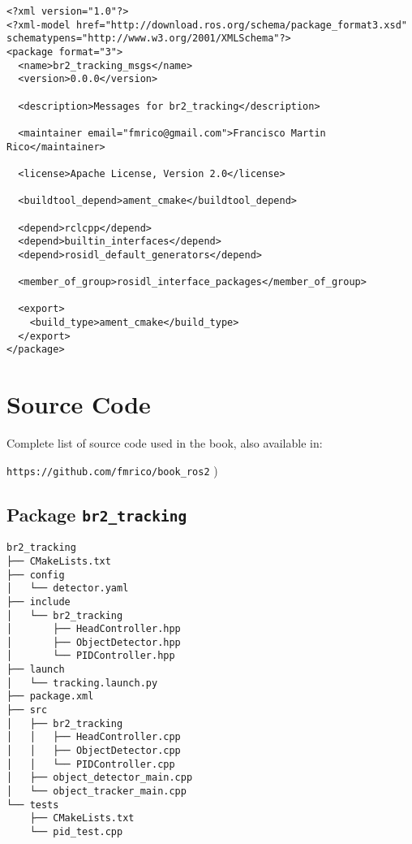  \footnotesize
\begin{tcolorbox}[sharp corners, colframe=gray!80, colback=LightGray, left=0pt, top=0pt, bottom=0pt, title=\texttt{br2\_tracking\_msgs/package.xml}]
  \begin{verbatim}
<?xml version="1.0"?>
<?xml-model href="http://download.ros.org/schema/package_format3.xsd" schematypens="http://www.w3.org/2001/XMLSchema"?>
<package format="3">
  <name>br2_tracking_msgs</name>
  <version>0.0.0</version>

  <description>Messages for br2_tracking</description>

  <maintainer email="fmrico@gmail.com">Francisco Martin Rico</maintainer>

  <license>Apache License, Version 2.0</license>

  <buildtool_depend>ament_cmake</buildtool_depend>

  <depend>rclcpp</depend>
  <depend>builtin_interfaces</depend>
  <depend>rosidl_default_generators</depend>

  <member_of_group>rosidl_interface_packages</member_of_group>

  <export>
    <build_type>ament_cmake</build_type>
  </export>
</package>
    \end{verbatim}
    \end{tcolorbox}
  \normalsize



\appendix

\chapter[Source Code]{Source Code}
\label{cap:source}
Complete list of source code used in the book, also available in:

\vspace{0.5cm}
\large
\texttt{https://github.com/fmrico/book\_ros2}
\normalsize
)
\section{Package \texttt{br2\_tracking}}
\label{sec:anex:br2_tracking}

 \footnotesize
\begin{tcolorbox}[sharp corners, colframe=gray!80, colback=LightGray, left=0pt, top=0pt, bottom=0pt, title=Package \texttt{br2\_tracking}]
  \begin{verbatim}
br2_tracking
├── CMakeLists.txt
├── config
│   └── detector.yaml
├── include
│   └── br2_tracking
│       ├── HeadController.hpp
│       ├── ObjectDetector.hpp
│       └── PIDController.hpp
├── launch
│   └── tracking.launch.py
├── package.xml
├── src
│   ├── br2_tracking
│   │   ├── HeadController.cpp
│   │   ├── ObjectDetector.cpp
│   │   └── PIDController.cpp
│   ├── object_detector_main.cpp
│   └── object_tracker_main.cpp
└── tests
    ├── CMakeLists.txt
    └── pid_test.cpp    \end{verbatim}
    \end{tcolorbox}
  \normalsize

